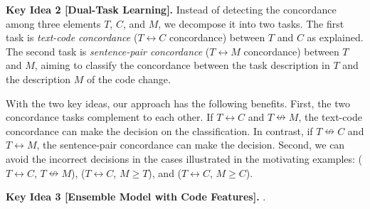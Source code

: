 {\bf Key Idea 2 [Dual-Task Learning].} Instead of detecting the
concordance among three elements $T$, $C$, and $M$, we decompose it
into two tasks. The first task is {\em text-code concordance} ($T
\leftrightarrow C$ concordance) between $T$ and $C$ as explained. The
second task is {\em sentence-pair concordance} ($T \leftrightarrow M$
concordance) between $T$ and $M$, aiming to classify the concordance
between the task description in $T$ and the description $M$ of the
code change.

With the two key ideas, our approach has the following benefits.
First, the two concordance tasks complement to each other. If $T
\leftrightarrow C$ and $T \nleftrightarrow M$, the text-code
concordance can make the decision on the classification. In contrast,
if $T \nleftrightarrow C$ and $T \leftrightarrow M$, the sentence-pair
concordance can make the decision. Second, we can avoid the incorrect
decisions in the cases illustrated in the motivating examples: ($T
\leftrightarrow C$, $T \nleftrightarrow M$), ($T \leftrightarrow C$,
$M \geq T$), and ($T \leftrightarrow C$, $M \geq C$).

{\bf Key Idea 3 [Ensemble Model with Code Features].} {}.

 
